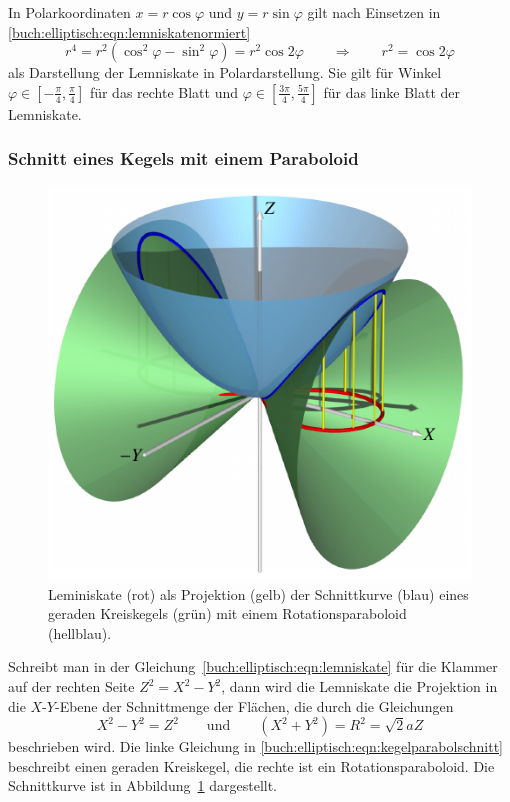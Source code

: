 In Polarkoordinaten $x=r\cos\varphi$ und $y=r\sin\varphi$
gilt nach Einsetzen in \eqref{buch:elliptisch:eqn:lemniskatenormiert}
\begin{equation}
r^4
=
r^2(\cos^2\varphi-\sin^2\varphi)
=
r^2\cos2\varphi
\qquad\Rightarrow\qquad
r^2 = \cos 2\varphi
\label{buch:elliptisch:eqn:lemniskatepolar}
\end{equation}
als Darstellung der Lemniskate in Polardarstellung.
Sie gilt für Winkel $\varphi\in[-\frac{\pi}4,\frac{\pi}4]$ für das
rechte Blatt und $\varphi\in[\frac{3\pi}4,\frac{5\pi}4]$ für das linke
Blatt der Lemniskate.

%
%
\subsubsection{Schnitt eines Kegels mit einem Paraboloid}
\begin{figure}
\center
\includegraphics{chapters/110-elliptisch/images/kegelpara.pdf}
\caption{Leminiskate (rot) als Projektion (gelb) der Schnittkurve (blau)
eines geraden
Kreiskegels (grün) mit einem Rotationsparaboloid (hellblau).
\label{buch:elliptisch:lemniskate:kegelpara}}
\end{figure}%
Schreibt man in der Gleichung~\eqref{buch:elliptisch:eqn:lemniskate}
für die Klammer auf der rechten Seite $Z^2 = X^2 - Y^2$, dann wird die
Lemniskate die Projektion in die $X$-$Y$-Ebene der Schnittmenge der Flächen,
die durch die Gleichungen
\begin{equation}
X^2-Y^2 = Z^2
\qquad\text{und}\qquad
(X^2+Y^2) = R^2 = \sqrt{2}aZ
\label{buch:elliptisch:eqn:kegelparabolschnitt}
\end{equation}
beschrieben wird.
Die linke Gleichung in 
\eqref{buch:elliptisch:eqn:kegelparabolschnitt}
beschreibt einen geraden Kreiskegel, die rechte ist ein Rotationsparaboloid.
Die Schnittkurve ist in Abbildung~\ref{buch:elliptisch:lemniskate:kegelpara}
dargestellt.

